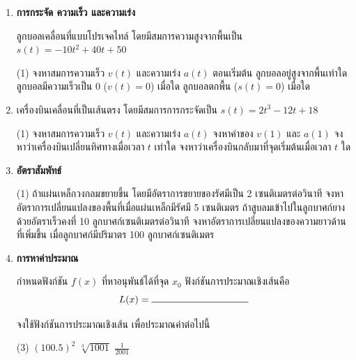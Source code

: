 \begin{enumerate}
\item \textbf{การกระจัด ความเร็ว และความเร่ง}

ลูกบอลเคลื่อนที่แบบโปรเจคไทล์ โดยมีสมการความสูงจากพื้นเป็น $s(t) = -10t^2 + 40t + 50$
\begin{tasks}[after-item-skip = 40pt, after-skip = 40pt](1)
\task จงหาสมการความเร็ว $v(t)$ และความเร่ง $a(t)$
\task ตอนเริ่มต้น ลูกบอลอยู่สูงจากพื้นเท่าใด
\task ลูกบอลมีความเร็วเป็น 0 ($v(t) = 0$) เมื่อใด
\task ลูกบอลตกพื้น ($s(t) = 0$) เมื่อใด
\end{tasks}


\item  เครื่องบินเคลื่อนที่เป็นเส้นตรง โดยมีสมการการกระจัดเป็น $s(t) = 2t^3 - 12t + 18$
\begin{tasks}[after-item-skip = 40pt, after-skip = 40pt](1)
\task จงหาสมการความเร็ว $v(t)$ และความเร่ง $a(t)$
\task จงหาค่าของ $v(1)$ และ $a(1)$
\task จงหาว่าเครื่องบินเปลี่ยนทิศทางเมื่อเวลา $t$ เท่าใด
\task จงหาว่าเครื่องบินกลับมาที่จุดเริ่มต้นเมื่อเวลา $t$ ใด
\end{tasks}


\newpage 

\item \textbf{อัตราสัมพัทธ์}
\begin{tasks}[after-item-skip = 150pt, after-skip = 150pt](1)
\task ถ้าแผ่นเหล็กวงกลมขยายขึ้น โดยมีอัตราการขยายของรัศมีเป็น 2 เซนติเมตรต่อวินาที จงหาอัตราการเปลี่ยนแปลงของพื้นที่เมื่อแผ่นเหล็กมีรัศมี 5 เซนติเมตร
\task ถ้าสูบลมเข้าไปในลูกบาศก์ยางด้วยอัตราเร็วคงที่ 10 ลูกบาศก์เซนติเมตรต่อวินาที จงหาอัตราการเปลี่ยนแปลงของความยาวด้านที่เพิ่มขึ้น เมื่อลูกบาศก์มีปริมาตร 100 ลูกบาศก์เซนติเมตร
\end{tasks}

\item \textbf{การหาค่าประมาณ}

กำหนดฟังก์ชัน $f(x)$ ที่หาอนุพันธ์ได้ที่จุด $x_0$ ฟังก์ชันการประมาณเชิงเส้นคือ
\[ L(x) = \rule{100pt}{0.5pt} \]

จงใช้ฟังก์ชันการประมาณเชิงเส้น เพื่อประมาณค่าต่อไปนี้
\begin{tasks}(3)
\task $(100.5)^2$ 
\task $\sqrt[3]{1001}$
\task $\frac{1}{2001}$
\end{tasks}

\end{enumerate}